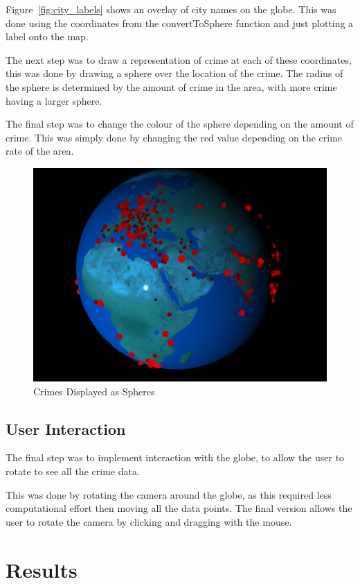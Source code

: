 \documentclass[]{article}
\begin{document}
Figure~\ref{fig:city_labels} shows an overlay of city names on the globe.
This was done using the coordinates from the convertToSphere function and just plotting a label onto the map.

The next step was to draw a representation of crime at each of these coordinates,
this was done by drawing a sphere over the location of the crime.
The radius of the sphere is determined by the amount of crime in the area,
with more crime having a larger sphere.

The final step was to change the colour of the sphere depending on the amount of crime.
This was simply done by changing the red value depending on the crime rate of the area.

\begin{figure}[H]
   \centering
   \includegraphics[width=0.8\linewidth]{images/crime_spheres}
   \caption{Crimes Displayed as Spheres}
   \label{fig:crime_spheres}
\end{figure}

\subsection{User Interaction}

The final step was to implement interaction with the globe, 
to allow the user to rotate to see all the crime data.

This was done by rotating the camera around the globe,
as this required less computational effort then moving all the data points.
The final version allows the user to rotate the camera by clicking and dragging with the mouse.

\section{Results}
\end{document}
